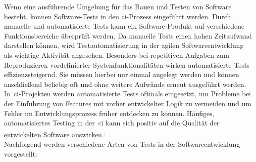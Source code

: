 Wenn eine ausführende Umgebung für das Bauen und Testen von Software besteht, können Software-Tests in den
\acrshort{ci}-Prozess eingeführt werden.
Durch manuelle und automatisierte Tests kann ein Software-Produkt auf verschiedene Funktionsbereiche überprüft werden.
Da manuelle Tests einen hohen Zeitaufwand darstellen können, wird Testautomatisierung in der agilen Softwareentwicklung
als wichtige Aktivität angesehen.
Besonders bei repetitiven Aufgaben zum Reproduzieren vordefinierter Systemfunktionalitäten wirken automatisierte
Tests effizienzsteigernd.
Sie müssen hierbei nur einmal angelegt werden und können anschließend beliebig oft und ohne weitere Aufwände erneut
ausgeführt werden.
In\ \acrshort{ci}-Projekten werden automatisierte Tests oftmals eingesetzt, um Probleme bei der
Einführung von Features mit vorher entwickelter Logik zu vermeiden und um Fehler im Entwicklungsprozess früher
entdecken zu können.
Häufiges, automatisiertes Testing in der\ \acrshort{ci} kann sich positiv auf die Qualität der entwickelten Software
auswirken.\textsuperscript{,\ }
\\
Nachfolgend werden verschiedene Arten von Tests in der Softwareentwicklung vorgestellt:

